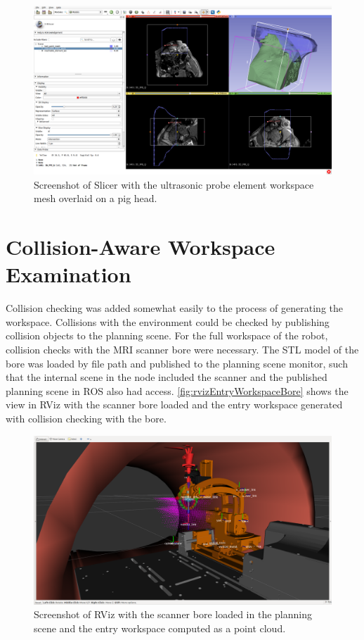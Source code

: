 \documentclass[12pt]{report}
\begin{document}
\begin{figure}[thpb]
	\centering
	\includegraphics[width=\textwidth]{images/slicer_element_workspace.png}
    \caption{Screenshot of Slicer with the ultrasonic probe element workspace mesh overlaid on a pig head.}
    \label{fig:elementWorkspace}
\end{figure}


\section{Collision-Aware Workspace Examination}
Collision checking was added somewhat easily to the process of generating the workspace. Collisions with the environment could be checked by publishing collision objects to the planning scene. For the full workspace of the robot, collision checks with the MRI scanner bore were necessary. The STL model of the bore was loaded by file path and published to the planning scene monitor, such that the internal scene in the node included the scanner and the published planning scene in ROS also had access. \autoref{fig:rvizEntryWorkspaceBore} shows the view in RViz with the scanner bore loaded and the entry workspace generated with collision checking with the bore.

\begin{figure}[thpb]
	\centering
	\includegraphics[width=\textwidth]{images/rviz_entry_workspace_bore.png}
    \caption{Screenshot of RViz with the scanner bore loaded in the planning scene and the entry workspace computed as a point cloud.}
    \label{fig:rvizEntryWorkspaceBore}
\end{figure}
\end{document}
